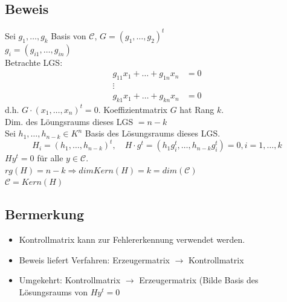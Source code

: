 \subsection{Beweis}
Sei $g_1,\ldots,g_k$ Basis von $\mathcal{C}$, $G=(g_1,\ldots,g_2)^t$ \\
$g_i=(g_{i1},\ldots,g_{in})$\\
Betrachte LGS: 
\begin{align*}
	g_{11} x_1 + \ldots + g_{1n} x_n &= 0\\
	\vdots&\\
	g_{k1} x_1 + \ldots + g_{kn} x_n &= 0
\end{align*}
d.h. $G \cdot (x_1,\ldots,x_n)^t = 0$. Koeffizientmatrix $G$ hat Rang $k$.\\
Dim. des L\"oungsraums dieses LGS $= n - k$ \\
Sei $h_1,\ldots,h_{n-k} \in K^n$ Basis des L\"osungsraums dieses LGS. \\
\[
	H_i=(h_1,\ldots, h_{n-k})^t, \quad H \cdot g^t = (h_1 g_i^t, \ldots, h_{n-k} g_i^t)=0,i=1,\ldots,k
\]
$H y^t=0$ f\"ur alle $y \in \mathcal{C}$.\\
$rg(H)=n-k \Rightarrow dim Kern(H) = k = dim ( \mathcal{C})$\\
$\mathcal{C}=Kern(H)$

\subsection{Bermerkung}
\begin{itemize}
	\item Kontrollmatrix kann zur Fehlererkennung verwendet werden.	
	\item Beweis liefert Verfahren: Erzeugermatrix $\rightarrow$ Kontrollmatrix
	\item Umgekehrt: Kontrollmatrix $\rightarrow$ Erzeugermatrix (Bilde Basis des L\"osungsraums von $H y^t=0$
\end{itemize}

